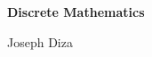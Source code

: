\begin{titlepage}
    \begin{center}
        \vspace*{1cm}
        \huge \textbf{Discrete Mathematics}

        \vspace*{1.5em}

        \Large{Joseph Diza}

        \vfill
    \end{center}
\end{titlepage}
